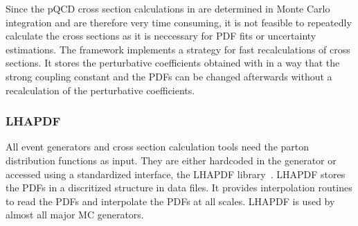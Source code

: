 Since the pQCD cross section calculations in \NLOJETPP are determined in Monte
Carlo integration and are therefore very time consuming, it is not feasible to
repeatedly calculate the cross sections as it is neccessary for PDF fits or
uncertainty estimations. The \fastNLO framework implements a strategy for fast
recalculations of cross sections. It stores the perturbative coefficients
obtained with \NLOJETPP in a way that the strong coupling constant and the PDFs
can be changed afterwards without a recalculation of the perturbative
coefficients.

\subsubsection{LHAPDF}

All event generators and cross section calculation tools need the parton
distribution functions as input. They are either hardcoded in the generator or
accessed using a standardized interface, the LHAPDF
library~\cite{Whalley:2005nh,Buckley:2014ana}. LHAPDF stores the PDFs in a discritized
structure in data files. It provides interpolation routines to read the PDFs and
interpolate the PDFs at all scales. LHAPDF is used by almost all major MC
generators.
